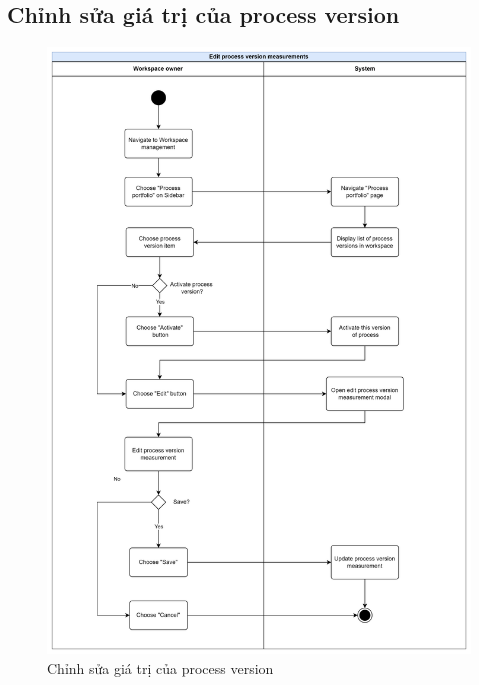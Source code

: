 \subsection{Chỉnh sửa giá trị của process version}
\begin{figure}[H]
    \centering
    \includegraphics[width=0.8\linewidth]{Content/Phân tích và thiết kế hệ thống/documents/Sơ đồ hoạt động/images/editProcessVersionMeasurement.png}
    \vspace{0.5cm}
    \caption{Chỉnh sửa giá trị của process version}
    \label{fig:Chỉnh sửa giá trị của process version}
\end{figure}